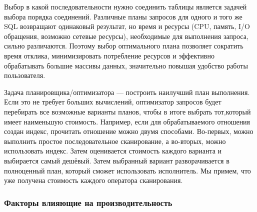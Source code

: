 \documentclass[12pt]{article}
\begin{document}
\begin{flushleft}
\begin{center}
    \end{center}

Выбор в какой последовательности нужно соединить таблицы является задачей выбора 
порядка соединений. Различные планы запросов для одного и того же SQL возвращают 
одинаковый результат, но время и ресурсы (CPU, память, I/O обращения, возможно 
сетевые ресурсы), необходимые для выполнения запроса, сильно различаются. Поэтому 
выбор оптимального плана позволяет сократить время отклика, минимизировать 
потребление ресурсов и эффективно обрабатывать большие массивы данных, значительно 
повышая удобство работы пользователя.
\newline

    Задача планировщика/оптимизатора — построить наилучший план выполнения. 
Если это не требует больших вычислений, оптимизатор запросов будет перебирать 
все возможные варианты планов, чтобы в итоге выбрать тот,который имеет наименьшую 
стоимость. Например, если для обрабатываемого отношения создан индекс, прочитать 
отношение можно двумя способами. Во-первых, можно выполнить простое последовательное 
сканирование, а во-вторых, можно использовать индекс. Затем оценивается стоимость 
каждого варианта и выбирается самый дешёвый. Затем выбранный вариант 
разворачивается в полноценный план, который сможет использовать исполнитель. 
Мы примем, что уже получена стоимость каждого оператора сканирования.

\centering \subsubsection*{Факторы влияющие на производительность}
\raggedright


\end{flushleft}
\end{document}
